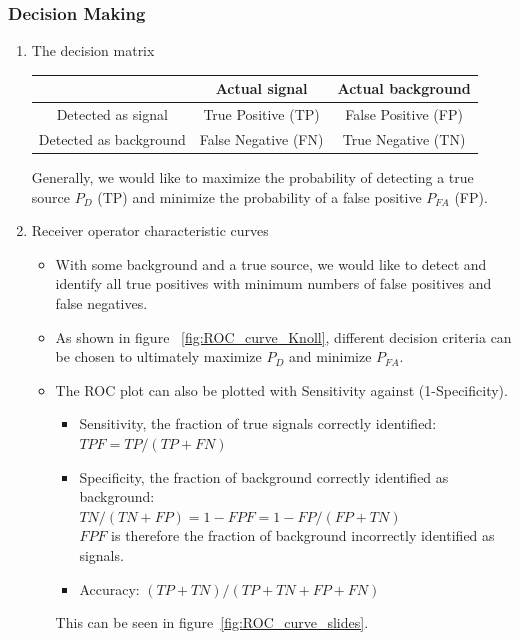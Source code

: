 \subsubsection{Decision Making}
\begin{enumerate}
    \item The decision matrix
    \begin{center}
    \begin{tabular}{|c|c|c|}
    \hline
     & Actual signal & Actual background \\
    \hline
    Detected as signal     &  True Positive (TP) & False Positive (FP) \\
    \hline
    Detected as background & False Negative (FN) & True Negative (TN) \\
    \hline
    \end{tabular}
    \end{center}
    Generally, we would like to maximize the probability of detecting a true source $P_D$ (TP) and minimize the probability of a false positive $P_{FA}$ (FP).
    \item Receiver operator characteristic curves
    \begin{itemize}
        \item With some background and a true source, we would like to detect and identify all true positives with minimum numbers of false positives and false negatives. 
        \item As shown in figure ~\ref{fig:ROC_curve_Knoll}, different decision criteria can be chosen to ultimately maximize $P_D$ and minimize $P_{FA}$.
        \item The ROC plot can also be plotted with Sensitivity against (1-Specificity).
        \begin{itemize}
            \item Sensitivity, the fraction of true signals correctly identified: \\$TPF=TP/(TP+FN)$
            \item Specificity, the fraction of background correctly identified as background:\\ $TN/(TN+FP)=1-FPF=1-FP/(FP+TN)$\\
            $FPF$ is therefore the fraction of background incorrectly identified as signals.
            \item Accuracy: $(TP+TN)/(TP+TN+FP+FN)$
        \end{itemize}
        This can be seen in figure~\ref{fig:ROC_curve_slides}.
    \end{itemize}

\end{enumerate}
